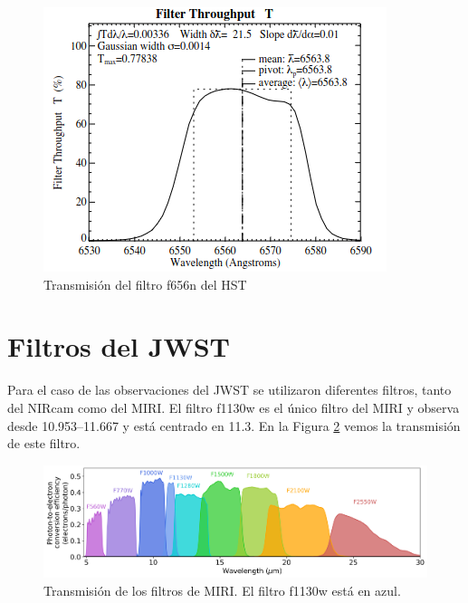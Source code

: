 \documentclass{book}
\begin{document}
\begin{figure}
    \centering
    \includegraphics[width=\textwidth]{Appendices/f656n_filter.png}
    \caption{Transmisión del filtro f656n del HST}
    \label{fig:filtro f656n}
\end{figure}

\section{Filtros del JWST}\label{AP S:JWST}

Para el caso de las observaciones del JWST se utilizaron diferentes filtros, tanto del NIRcam como del MIRI. El filtro f1130w es el único filtro del MIRI y observa desde 10.953--\SI{11.667}{\mum} y está centrado en \SI{11.3}{\mum}. En la Figura \ref{fig:filtos MIRI} vemos la transmisión de este filtro.

\begin{figure}
    \centering
    \includegraphics[width=\textwidth]{Appendices/miri_img_pces_ETC4.0.png}
    \caption{Transmisión de los filtros de MIRI. El filtro f1130w está en azul.}
    \label{fig:filtos MIRI}
\end{figure}
\end{document}
